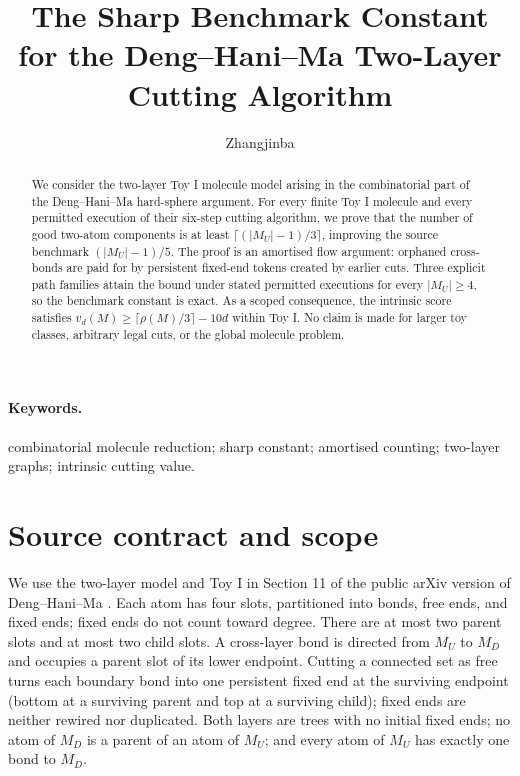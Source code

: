 \documentclass[12pt]{article}
\title{The Sharp Benchmark Constant for the Deng--Hani--Ma Two-Layer Cutting Algorithm}
\author{Zhangjinba}
\newcommand{\MU}{M_U}
\newcommand{\MD}{M_D}
\begin{document}
\maketitle

\begin{abstract}
We consider the two-layer Toy I molecule model arising in the combinatorial
part of the Deng--Hani--Ma hard-sphere argument.  For every finite Toy I
molecule and every permitted execution of their six-step cutting algorithm, we
prove that the number of good two-atom components is at least
\(\lceil(|M_U|-1)/3\rceil\), improving the source benchmark \((|M_U|-1)/5\).
The proof is an amortised flow argument: orphaned cross-bonds are paid for by
persistent fixed-end tokens created by earlier cuts.  Three explicit path
families attain the bound under stated permitted executions for every
\(|M_U|\ge4\), so the benchmark constant is exact.  As a scoped consequence,
the intrinsic score satisfies
\(v_d(M)\ge\lceil\rho(M)/3\rceil-10d\) within Toy I.  No claim is made for
larger toy classes, arbitrary legal cuts, or the global molecule problem.
\end{abstract}

\paragraph{Keywords.} combinatorial molecule reduction; sharp constant;
amortised counting; two-layer graphs; intrinsic cutting value.

\section{Source contract and scope}

We use the two-layer model and Toy I in Section 11 of the public arXiv version
of Deng--Hani--Ma \cite[Definitions 11.1--11.4]{DHM}.  Each atom has four
slots, partitioned into bonds, free ends, and fixed ends; fixed ends do not
count toward degree.  There are at most two parent slots and at most two child
slots.  A cross-layer bond is directed from \(\MU\) to \(\MD\) and occupies a
parent slot of its lower endpoint.  Cutting a connected set as free turns each
boundary bond into one persistent fixed end at the surviving endpoint (bottom
at a surviving parent and top at a surviving child); fixed ends are neither
rewired nor duplicated.  Both layers are trees with no initial fixed ends; no
atom of \(\MD\) is a parent of an atom of \(\MU\); and every atom of \(\MU\)
has exactly one bond to \(\MD\).
\end{document}
